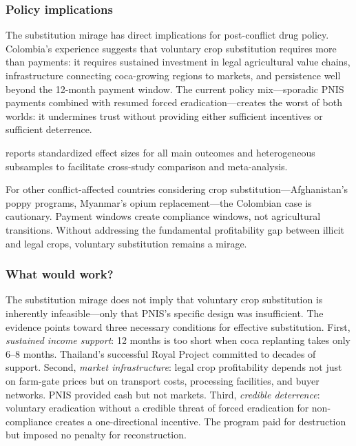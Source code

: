 \documentclass[12pt]{article}
\begin{document}
\subsubsection*{Policy implications} The substitution mirage has direct implications for post-conflict drug policy. Colombia's experience suggests that voluntary crop substitution requires more than payments: it requires sustained investment in legal agricultural value chains, infrastructure connecting coca-growing regions to markets, and persistence well beyond the 12-month payment window. The current policy mix---sporadic PNIS payments combined with resumed forced eradication---creates the worst of both worlds: it undermines trust without providing either sufficient incentives or sufficient deterrence.

 reports standardized effect sizes for all main outcomes and heterogeneous subsamples to facilitate cross-study comparison and meta-analysis.

For other conflict-affected countries considering crop substitution---Afghanistan's poppy programs, Myanmar's opium replacement---the Colombian case is cautionary. Payment windows create compliance windows, not agricultural transitions. Without addressing the fundamental profitability gap between illicit and legal crops, voluntary substitution remains a mirage.

\subsubsection*{What would work?} The substitution mirage does not imply that voluntary crop substitution is inherently infeasible---only that PNIS's specific design was insufficient. The evidence points toward three necessary conditions for effective substitution. First, \emph{sustained income support}: 12 months is too short when coca replanting takes only 6--8 months. Thailand's successful Royal Project committed to decades of support. Second, \emph{market infrastructure}: legal crop profitability depends not just on farm-gate prices but on transport costs, processing facilities, and buyer networks. PNIS provided cash but not markets. Third, \emph{credible deterrence}: voluntary eradication without a credible threat of forced eradication for non-compliance creates a one-directional incentive. The program paid for destruction but imposed no penalty for reconstruction.
\end{document}
